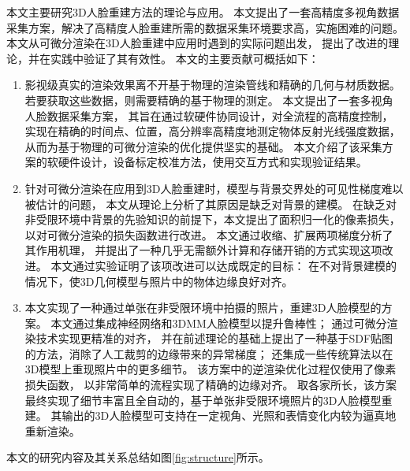本文主要研究3D人脸重建方法的理论与应用。
本文提出了一套高精度多视角数据采集方案，解决了高精度人脸重建所需的数据采集环境要求高，实施困难的问题。
本文从可微分渲染在3D人脸重建中应用时遇到的实际问题出发，
提出了改进的理论，并在实践中验证了其有效性。
本文的主要贡献可概括如下：

\begin{enumerate}
\item 影视级真实的渲染效果离不开基于物理的渲染管线和精确的几何与材质数据。
若要获取这些数据，则需要精确的基于物理的测定。
本文提出了一套多视角人脸数据采集方案，
其旨在通过软硬件协同设计，对全流程的高精度控制，实现在精确的时间点、位置，高分辨率高精度地测定物体反射光线强度数据，
从而为基于物理的可微分渲染的优化提供坚实的基础。
本文介绍了该采集方案的软硬件设计，设备标定校准方法，使用交互方式和实现验证结果。

\item 针对可微分渲染在应用到3D人脸重建时，模型与背景交界处的可见性梯度难以被估计的问题，
本文从理论上分析了其原因是缺乏对背景的建模。
在缺乏对非受限环境中背景的先验知识的前提下，本文提出了面积归一化的像素损失，
以对可微分渲染的损失函数进行改进。
本文通过收缩、扩展两项梯度分析了其作用机理，
并提出了一种几乎无需额外计算和存储开销的方式实现这项改进。
本文通过实验证明了该项改进可以达成既定的目标：
在不对背景建模的情况下，使3D几何模型与照片中的物体边缘良好对齐。

\item 本文实现了一种通过单张在非受限环境中拍摄的照片，重建3D人脸模型的方案。
本文通过集成神经网络和3DMM人脸模型以提升鲁棒性；
通过可微分渲染技术实现更精准的对齐，
并在前述理论的基础上提出了一种基于SDF贴图的方法，消除了人工裁剪的边缘带来的异常梯度；
还集成一些传统算法以在3D模型上重现照片中的更多细节。
该方案中的逆渲染优化过程仅使用了像素损失函数，
以非常简单的流程实现了精确的边缘对齐。
取各家所长，该方案最终实现了细节丰富且全自动的，基于单张非受限环境照片的3D人脸模型重建。
其输出的3D人脸模型可支持在一定视角、光照和表情变化内较为逼真地重新渲染。

\end{enumerate}
本文的研究内容及其关系总结如图\ref{fig:structure}所示。

